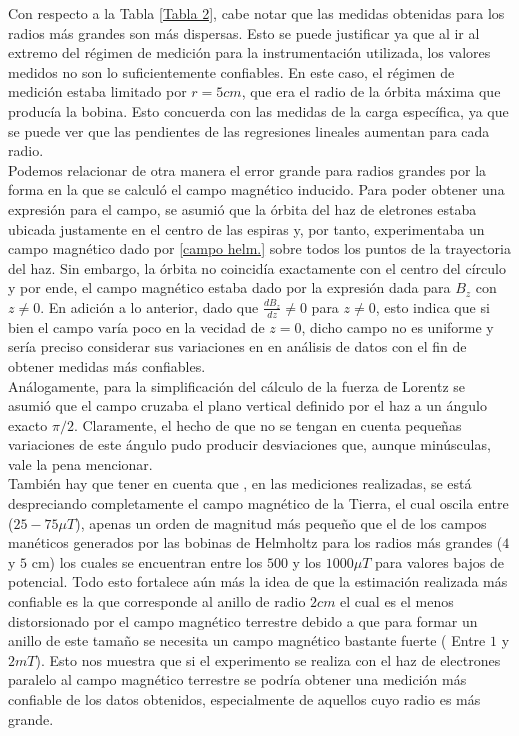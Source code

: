 \documentclass[prb,aps,twocolumn,preprintnumbers,amsmath,amssymb]{revtex4}
\begin{document}
Con respecto a la Tabla \ref{Tabla 2}, cabe notar que  las medidas obtenidas para los radios más grandes son más dispersas. Esto se puede justificar ya que al ir al extremo del régimen de medición para la instrumentación utilizada, los valores medidos no son lo suficientemente confiables. En este caso, el régimen de medición estaba limitado por $r = 5cm$, que era el radio de la órbita máxima que producía la bobina. Esto concuerda con las medidas de la carga específica, ya que se puede ver que las pendientes de las regresiones lineales aumentan para cada radio. \\

Podemos relacionar de otra manera el error grande para radios grandes por la forma en la que se calculó el campo magnético inducido. Para poder obtener una expresión para el campo, se asumió que la órbita del haz de eletrones estaba ubicada justamente en el centro de las espiras y, por tanto, experimentaba un campo magnético dado por \eqref{campo helm.} sobre todos los puntos de la trayectoria del haz. Sin embargo, la órbita no coincidía exactamente con el centro del círculo y por ende, el campo magnético estaba dado por la expresión dada para $B_{z}$ con $z \neq 0$. En adición a lo anterior, dado que $\frac{dB_{z}}{dz} \neq 0$ para $z \neq 0$, esto indica que si bien el campo varía poco en la vecidad de $z = 0$, dicho campo no es uniforme y sería preciso considerar sus variaciones en en análisis de datos con el fin de obtener medidas más confiables.\\  


Análogamente, para la simplificación del cálculo de la fuerza de Lorentz se asumió que el campo cruzaba el plano vertical definido por el haz a un ángulo exacto $ \pi /2 $. Claramente, el hecho de que no se tengan en cuenta pequeñas variaciones de este ángulo pudo producir desviaciones que, aunque minúsculas, vale la pena mencionar. \\

También hay que tener en cuenta que , en las mediciones realizadas, se está despreciando completamente el campo magnético de la Tierra, el cual oscila entre ($25-75 \mu T$), apenas un orden de magnitud más pequeño que el de los campos manéticos generados por las bobinas de Helmholtz para los radios más grandes ($4$ y $5$ cm) los cuales se encuentran entre los $500$ y los $1000 \mu T$ para valores bajos de potencial. Todo esto fortalece aún más la idea de que la estimación realizada más confiable es la que corresponde al anillo de radio $2cm$ el cual  es el menos distorsionado por el campo magnético terrestre debido a que para formar un anillo de este tamaño se necesita un campo magnético bastante fuerte ( Entre $1$ y $2 mT$). Esto nos muestra que si el experimento se realiza con el haz de electrones paralelo al campo magnético terrestre se podría obtener una medición más confiable de los datos obtenidos, especialmente de aquellos cuyo radio es más grande. 
\end{document}
